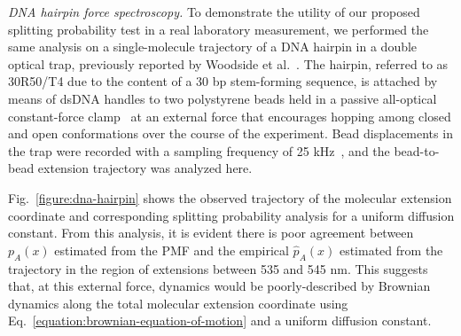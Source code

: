 \documentclass[aps,prl,twocolumn,superscriptaddress,floatfix]{revtex4-1}
\begin{document}
\noindent\emph{DNA hairpin force spectroscopy.}
To demonstrate the utility of our proposed splitting probability test in a real laboratory measurement, we performed the same analysis on a single-molecule trajectory of a DNA hairpin in a double optical trap, previously reported by Woodside et al.~\cite{woodside:science:2006:dna-hairpin-optical-trap}.
The hairpin, referred to as 30R50/T4 due to the content of a 30 bp stem-forming sequence, is attached by means of dsDNA handles to two polystyrene beads held in a passive all-optical constant-force clamp~\cite{woodside:prl:2005:optical-force-clamp} at an external force that encourages hopping among closed and open conformations over the course of the experiment.
Bead displacements in the trap were recorded with a sampling frequency of 25 kHz~\cite{woodside:science:2006:dna-hairpin-optical-trap}, and the bead-to-bead extension trajectory was analyzed here.

Fig.~\ref{figure:dna-hairpin} shows the observed trajectory of the molecular extension coordinate and corresponding splitting probability analysis
\color{black}
for a uniform diffusion constant.
\color{black}
From this analysis, it is evident there is poor agreement between $p_A(x)$ estimated from the PMF and the empirical $\hat{p}_A(x)$ estimated from the trajectory in the region of extensions between 535 and 545 nm.
This suggests that, at this external force, dynamics would be poorly-described by Brownian dynamics along the total molecular extension coordinate using Eq.~\ref{equation:brownian-equation-of-motion} {\color{black} and a uniform diffusion constant}.
\end{document}
